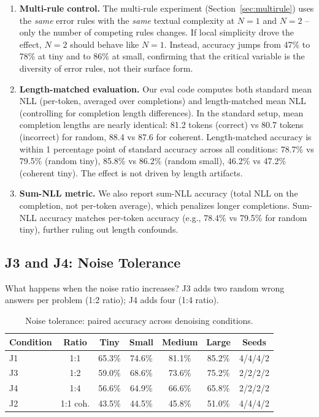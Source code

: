 \documentclass[10pt]{article} %
\begin{document}
\begin{enumerate}
    \item \textbf{Multi-rule control.} The multi-rule experiment (Section~\ref{sec:multirule}) uses the \textit{same} error rules with the \textit{same} textual complexity at $N{=}1$ and $N{=}2$ -- only the number of competing rules changes. If local simplicity drove the effect, $N{=}2$ should behave like $N{=}1$. Instead, accuracy jumps from 47\% to 78\% at tiny and to 86\% at small, confirming that the critical variable is the diversity of error rules, not their surface form.

    \item \textbf{Length-matched evaluation.} Our eval code computes both standard mean NLL (per-token, averaged over completions) and length-matched mean NLL (controlling for completion length differences). In the standard setup, mean completion lengths are nearly identical: 81.2 tokens (correct) vs 80.7 tokens (incorrect) for random, 88.4 vs 87.6 for coherent. Length-matched accuracy is within 1 percentage point of standard accuracy across all conditions: 78.7\% vs 79.5\% (random tiny), 85.8\% vs 86.2\% (random small), 46.2\% vs 47.2\% (coherent tiny). The effect is not driven by length artifacts.

    \item \textbf{Sum-NLL metric.} We also report sum-NLL accuracy (total NLL on the completion, not per-token average), which penalizes longer completions. Sum-NLL accuracy matches per-token accuracy (e.g., 78.4\% vs 79.5\% for random tiny), further ruling out length confounds.
\end{enumerate}

\subsection{J3 and J4: Noise Tolerance}
\label{sec:j3j4}

What happens when the noise ratio increases? J3 adds two random wrong answers per problem (1:2 ratio); J4 adds four (1:4 ratio).

\begin{table}[t]
\caption{Noise tolerance: paired accuracy across denoising conditions.}
\label{tab:noise}
\centering
\begin{tabular}{lcccccc}
\toprule
Condition & Ratio & Tiny & Small & Medium & Large & Seeds \\
\midrule
J1 & 1:1 & 65.3\% & 74.6\% & 81.1\% & 85.2\% & 4/4/4/2 \\
J3 & 1:2 & 59.0\% & 68.6\% & 73.6\% & 75.2\% & 2/2/2/2 \\
J4 & 1:4 & 56.6\% & 64.9\% & 66.6\% & 65.8\% & 2/2/2/2 \\
J2 & 1:1 coh. & 43.5\% & 44.5\% & 45.8\% & 51.0\% & 4/4/4/2 \\
\bottomrule
\end{tabular}
\end{table}
\end{document}
